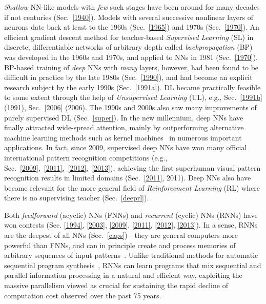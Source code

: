 \documentclass[letterpaper]{article}
\begin{document}
\begin{CJK*}{UTF8}{gbsn}
{\em Shallow} NN-like models with {\em few} such stages have been around for many decades 
if not centuries  (Sec.~\ref{1940}).
Models with several successive nonlinear layers of  neurons date back at least 
to the 1960s (Sec.~\ref{1965}) and  1970s (Sec.~\ref{1970}).
An efficient gradient descent method for teacher-based {\em Supervised Learning} (SL) in discrete,
differentiable networks 
of arbitrary depth 
called {\em  backpropagation} (BP)
was developed in the 1960s and 1970s, and applied to NNs in 1981 (Sec.~\ref{1970}).  
BP-based 
training of {\em deep} NNs with {\em many} layers, however, 
had been found to be difficult in practice by the late 1980s (Sec.~\ref{1990}), and had
become an explicit research subject 
by the early 1990s (Sec.~\ref{1991a}). 
DL became 
practically feasible to some extent through the help of
{\em Unsupervised Learning} (UL), e.g., Sec.~\ref{1991b} (1991), Sec.~\ref{2006} (2006).
The 1990s and 2000s also saw many improvements of 
purely supervised DL (Sec.~\ref{super}). 
In the new millennium, deep NNs have finally attracted wide-spread attention,
mainly by outperforming alternative machine learning methods
such as kernel machines~\citep{Vapnik:95,advkernel}
in numerous important applications.
In fact, since 2009,
supervised deep NNs
have won many
official international pattern recognition competitions (e.g.,
Sec.~\ref{2009},~\ref{2011},~\ref{2012},~\ref{2013}),  
achieving the first superhuman visual pattern recognition results in
limited domains (Sec.~\ref{2011}, 2011).
Deep NNs also have become relevant for the more general field of 
{\em Reinforcement Learning} (RL) where there is no supervising teacher (Sec.~\ref{deeprl}).


Both {\em feedforward} (acyclic) NNs (FNNs)
and {\em recurrent} (cyclic) NNs (RNNs) have won contests 
(Sec. \ref{1994}, \ref{2003}, \ref{2009}, \ref{2011}, \ref{2012}, \ref{2013}). 
In a sense, RNNs are the deepest of all NNs (Sec.~\ref{caps})---they are general computers
more powerful than FNNs, 
and can in principle create and process
 memories of arbitrary sequences of input patterns~\citep[e.g.,][]{siegelmann91turing,schmidhuber1990}. 
Unlike traditional methods for automatic sequential program synthesis~\citep[e.g.,][]{waldinger69,balzer1985,soloway1986,Deville:94}, RNNs can learn programs that mix sequential and parallel information processing in a natural and efficient way, exploiting the massive parallelism viewed as crucial for sustaining the rapid decline of computation cost observed over the past 75 years. 


\end{CJK*}
\end{document}
